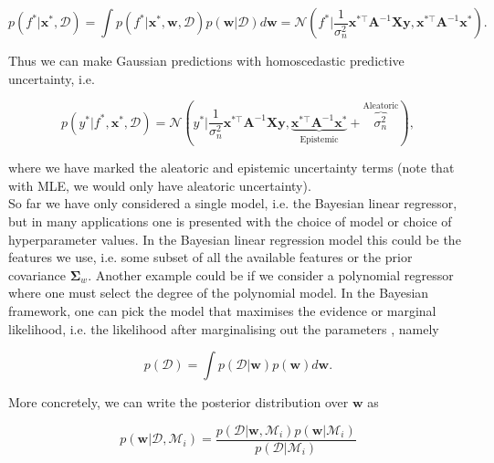 \begin{equation}
    p(f^*|\mathbf{x}^*, \mathcal{D}) = \int p(f^*\big|\mathbf{x}^*, \mathbf{w}, \mathcal{D})p(\mathbf{w}|\mathcal{D})d\mathbf{w}=\mathcal{N}(f^*\big|\frac{1}{\sigma_n^2}\mathbf{x}^{*\top}\mathbf{A}^{-1}\mathbf{X}\mathbf{y}, \mathbf{x}^{*\top}\mathbf{A}^{-1}\mathbf{x}^*).
\end{equation}

\noindent Thus we can make Gaussian predictions with homoscedastic predictive uncertainty, i.e.

\begin{equation}
\label{sec:posterior_predictive_gauss}
    p(y^*|f^*, \mathbf{x}^*, \mathcal{D}) = \mathcal{N}(y^*\big|\frac{1}{\sigma_n^2}\mathbf{x}^{*\top}\mathbf{A}^{-1}\mathbf{X}\mathbf{y},\underbrace{ \mathbf{x}^{*\top}\mathbf{A}^{-1}\mathbf{x}^*}_{\text{Epistemic}} + \overbrace{\sigma_n^2}^{\text{Aleatoric}}),
\end{equation}

\noindent where we have marked the aleatoric and epistemic uncertainty terms (note that with MLE, we would only have aleatoric uncertainty). \\

\noindent So far we have only considered a single model, i.e. the Bayesian linear regressor, but in many applications one is presented with the choice of model or choice of hyperparameter values. In the Bayesian linear regression model this could be the features we use, i.e. some subset of all the available features or the prior covariance $\bm\Sigma_w$. Another example could be if we consider a polynomial regressor where one must select the degree of the polynomial model. In the Bayesian framework, one can pick the model that maximises the evidence or marginal likelihood, i.e. the likelihood after marginalising out the parameters \citep{MacKay1996}, namely

\begin{equation}
    p(\mathcal{D}) = \int p(\mathcal{D}|\mathbf{w})p(\mathbf{w})d\mathbf{w}.
    \label{eq:marglike}
\end{equation}

 \noindent More concretely, we can write the posterior distribution over $\mathbf{w}$ as   

\begin{equation}
    p(\mathbf{w}|\mathcal{D}, \mathcal{M}_i) = \frac{p(\mathcal{D}|\mathbf{w}, \mathcal{M}_i)p(\mathbf{w}|\mathcal{M}_i)}{p(\mathcal{D}|\mathcal{M}_i)} 
\end{equation}

